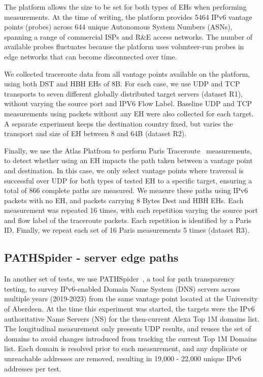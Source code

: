 \documentclass[conference]{IEEEtran}
\begin{document}
The platform allows the size to be set for both types of EHs when performing measurements. At the time of writing, the platform provides 5464 IPv6 vantage points (probes) across 644 unique Autonomous System Numbers (ASNs), spanning a range of commercial ISPs and R\&E access networks. The number of available probes fluctuates because the platform uses volunteer-run probes in edge networks that can become disconnected over time.

We collected traceroute data from all vantage points available on the platform, using both DST and HBH EHs of 8B. For each case, we use  UDP and TCP transports to seven different globally distributed target servers (dataset R1), without varying the source port and IPV6 Flow Label. Baseline UDP and TCP measurements using packets without any EH were also collected for each target.
A separate experiment keeps the destination country fixed, but varies the transport and size of EH between 8 and 64B (dataset R2).

Finally, we use the Atlas Platfrom to perform Paris Traceroute~\cite{augustin2006avoiding} measurements, to detect whether using an EH impacts the path taken between a vantage point and destination. In this case, we only select vantage points where traversal is successful over UDP for both types of tested EH to a specific target, ensuring a total of 866 complete paths are measured.
We measure these paths using IPv6 packets with no EH, and packets carrying 8 Bytes Dest and HBH EHs. Each measurement was repeated 16 times, with each repetition varying the source port and flow label of the traceroute packets. Each repetition is identified by a Paris ID. Finally, we repeat each set of 16 Paris measurements 5 times (dataset R3).


    \subsection{PATHSpider - server edge paths}
    \label{sec:pathspider-methodology}

In another set of tests, we use PATHSpider~\cite{learmonth2016pathspider}, a tool for path transparency testing, to survey IPv6-enabled Domain Name System (DNS) servers across multiple years (2019-2023) from the same vantage point located at the University of Aberdeen. 
At the time this experiment was started, the targets were the IPv6 authoritative Name Servers (NS) for the then-current Alexa Top 1M domains list. 
The longitudinal measurement only presents UDP results, and reuses the set of domains to avoid changes introduced from tracking the current Top 1M Domains list. 
Each domain is resolved prior to each measurement, and any duplicate or unreachable addresses are removed, resulting in 19,000 - 22,000 unique IPv6 addresses per test.
\end{document}
